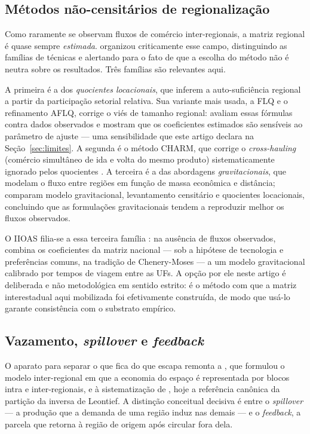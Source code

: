\documentclass[11pt,a4paper]{article}
\begin{document}
\subsection{Métodos não-censitários de regionalização}
Como raramente se observam fluxos de comércio inter-regionais, a matriz
regional é quase sempre \emph{estimada}. \citet{round1983nonsurvey} organizou
criticamente esse campo, distinguindo as famílias de técnicas e alertando para
o fato de que a escolha do método não é neutra sobre os resultados. Três
famílias são relevantes aqui.

A primeira é a dos \emph{quocientes locacionais}, que inferem a
auto-suficiência regional a partir da participação setorial relativa. Sua
variante mais usada, a FLQ e o refinamento AFLQ, corrige o viés de tamanho
regional: \citet{flegg2016evaluating} avaliam essas fórmulas contra dados
observados e mostram que os coeficientes estimados são sensíveis ao parâmetro
de ajuste --- uma sensibilidade que este artigo declara na
Seção~\ref{sec:limites}. A segunda é o método CHARM, que corrige o
\emph{cross-hauling} (comércio simultâneo de ida e volta do mesmo produto)
sistematicamente ignorado pelos quocientes \citep{tobben2015charm}. A terceira
é a das abordagens \emph{gravitacionais}, que modelam o fluxo entre regiões em
função de massa econômica e distância; \citet{riddington2006comparison}
comparam modelo gravitacional, levantamento censitário e quocientes
locacionais, concluindo que as formulações gravitacionais tendem a reproduzir
melhor os fluxos observados.

O IIOAS filia-se a essa terceira família \citep{haddad2017iioas}: na ausência
de fluxos observados, combina os coeficientes da matriz nacional --- sob a
hipótese de tecnologia e preferências comuns, na tradição de Chenery-Moses ---
a um modelo gravitacional calibrado por tempos de viagem entre as UFs. A opção
por ele neste artigo é deliberada e não metodológica em sentido estrito: é o
método com que a matriz interestadual aqui mobilizada foi efetivamente
construída, de modo que usá-lo garante consistência com o substrato empírico.

\subsection{Vazamento, \emph{spillover} e \emph{feedback}}
O aparato para separar o que fica do que escapa remonta a
\citet{isard1951}, que formulou o modelo inter-regional em que a economia do
espaço é representada por blocos intra e inter-regionais, e à sistematização
de \citet{millerblair2009}, hoje a referência canônica da partição da inversa
de Leontief. A distinção conceitual decisiva é entre o \emph{spillover} --- a
produção que a demanda de uma região induz nas demais --- e o \emph{feedback},
a parcela que retorna à região de origem após circular fora dela.
\end{document}
